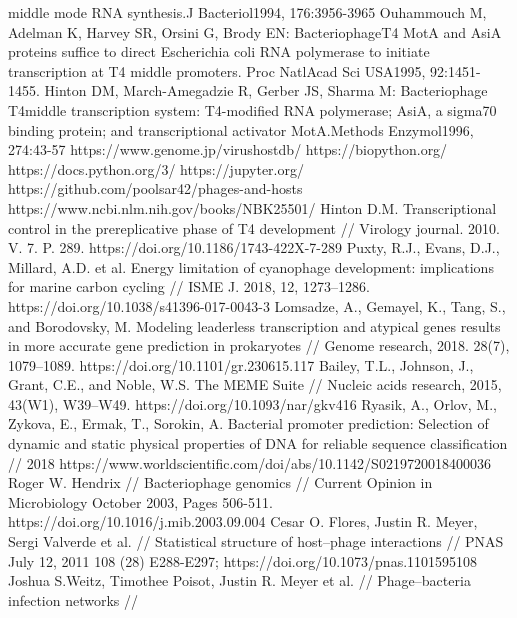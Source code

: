 \documentclass[14pt]{extarticle}
\begin{document}
\begin{thebibliography}{9}
    middle mode RNA synthesis.J  Bacteriol1994, 176:3956-3965
     Ouhammouch M, Adelman K, Harvey SR, Orsini G, Brody EN: BacteriophageT4 MotA and AsiA proteins 
    suffice to direct Escherichia coli RNA polymerase to initiate transcription at T4 middle promoters. Proc  NatlAcad  
    Sci  USA1995, 92:1451-1455.
     Hinton DM, March-Amegadzie R, Gerber JS, Sharma M: Bacteriophage T4middle transcription system: 
    T4-modified RNA polymerase; AsiA, a sigma70 binding protein; and transcriptional activator MotA.Methods  
    Enzymol1996, 274:43-57
     https://www.genome.jp/virushostdb/ 
     https://biopython.org/
     https://docs.python.org/3/
     https://jupyter.org/
     https://github.com/poolsar42/phages-and-hosts
     https://www.ncbi.nlm.nih.gov/books/NBK25501/
     Hinton D.M. Transcriptional control in the prereplicative phase of T4 development // Virology
    journal. 2010. V. 7. P. 289. https://doi.org/10.1186/1743-422X-7-289
     Puxty, R.J., Evans, D.J., Millard, A.D. et al. Energy limitation of cyanophage development:
    implications for marine carbon cycling // ISME J. 2018, 12, 1273–1286. https://doi.org/10.1038/s41396-017-0043-3
     Lomsadze, A., Gemayel, K., Tang, S., and Borodovsky, M. Modeling leaderless transcription and
    atypical genes results in more accurate gene prediction in prokaryotes // Genome research,  2018. 28(7), 1079–1089.
    https://doi.org/10.1101/gr.230615.117
     Bailey, T.L., Johnson, J., Grant, C.E., and Noble, W.S. The MEME Suite // Nucleic acids research,
    2015, 43(W1), W39–W49. https://doi.org/10.1093/nar/gkv416
     Ryasik, A., Orlov, M., Zykova, E., Ermak, T., Sorokin, A. Bacterial promoter prediction: Selection
    of dynamic and static physical properties of DNA for reliable sequence classification // 2018
    https://www.worldscientific.com/doi/abs/10.1142/S0219720018400036
     Roger W. Hendrix // Bacteriophage genomics // Current Opinion in Microbiology October 2003, Pages
    506-511. https://doi.org/10.1016/j.mib.2003.09.004
     Cesar O. Flores, Justin R. Meyer, Sergi Valverde et al. // Statistical structure of host–phage 
    interactions // PNAS July 12, 2011 108 (28) E288-E297; https://doi.org/10.1073/pnas.1101595108 
     Joshua S.Weitz, Timothee Poisot, Justin R. Meyer et al. // Phage–bacteria infection networks // 

\end{thebibliography}
\end{document}

